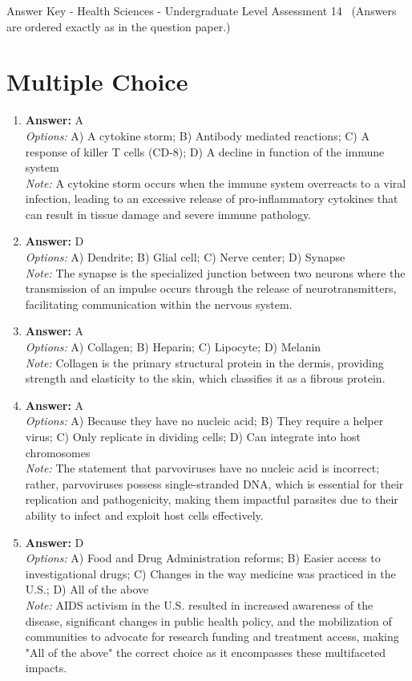 \documentclass[12pt]{article}
\begin{document}
\begin{center}
Answer Key - Health Sciences - Undergraduate Level Assessment 14 \
\small (Answers are ordered exactly as in the question paper.)
\end{center}

\section*{Multiple Choice}
\begin{enumerate}[label=\arabic*.]
\item \textbf{Answer:} A
\\ \textit{Options:} A) A cytokine storm; B) Antibody mediated reactions; C) A response of killer T cells (CD-8); D) A decline in function of the immune system
\\ \textit{Note:} A cytokine storm occurs when the immune system overreacts to a viral infection, leading to an excessive release of pro-inflammatory cytokines that can result in tissue damage and severe immune pathology.
\item \textbf{Answer:} D
\\ \textit{Options:} A) Dendrite; B) Glial cell; C) Nerve center; D) Synapse
\\ \textit{Note:} The synapse is the specialized junction between two neurons where the transmission of an impulse occurs through the release of neurotransmitters, facilitating communication within the nervous system.
\item \textbf{Answer:} A
\\ \textit{Options:} A) Collagen; B) Heparin; C) Lipocyte; D) Melanin
\\ \textit{Note:} Collagen is the primary structural protein in the dermis, providing strength and elasticity to the skin, which classifies it as a fibrous protein.
\item \textbf{Answer:} A
\\ \textit{Options:} A) Because they have no nucleic acid; B) They require a helper virus; C) Only replicate in dividing cells; D) Can integrate into host chromosomes
\\ \textit{Note:} The statement that parvoviruses have no nucleic acid is incorrect; rather, parvoviruses possess single-stranded DNA, which is essential for their replication and pathogenicity, making them impactful parasites due to their ability to infect and exploit host cells effectively.
\item \textbf{Answer:} D
\\ \textit{Options:} A) Food and Drug Administration reforms; B) Easier access to investigational drugs; C) Changes in the way medicine was practiced in the U.S.; D) All of the above
\\ \textit{Note:} AIDS activism in the U.S. resulted in increased awareness of the disease, significant changes in public health policy, and the mobilization of communities to advocate for research funding and treatment access, making "All of the above" the correct choice as it encompasses these multifaceted impacts.
\end{enumerate}
\end{document}
